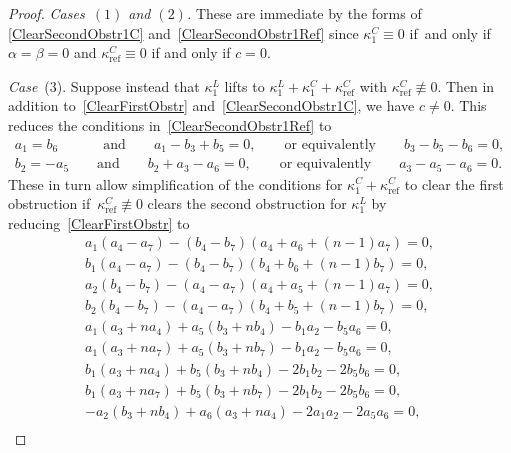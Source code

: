 \documentclass[10pt,a4paper]{amsart}
\numberwithin{equation}{section}
\DeclareMathOperator{\refl}{ref}
\begin{document}
\begin{proof}\quad

\textit{Cases~$(1)$ and $(2)$.} These are immediate by the forms of \eqref{ClearSecondObstr1C} and~\eqref{ClearSecondObstr1Ref} since $\kappa^C_1 \equiv 0$ if~and only if $\alpha=\beta=0$ and $\kappa^C_{\refl} \equiv 0$ if and only if $c=0$.

\textit{Case}~(3). Suppose instead that $\kappa^L_1$ lifts to $\kappa^L_1+\kappa^C_1+\kappa^C_{\refl}$
with $\kappa^C_{\refl} \not\equiv 0$. Then
in addition to~\eqref{ClearFirstObstr} and~\eqref{ClearSecondObstr1C},
we have $c \neq 0$. This reduces the conditions in~\eqref{ClearSecondObstr1Ref}
to
\begin{gather}\label{Obstr2kappaCrefc}
a_1=b_6 \phantom{-}\qquad \text{and} \qquad a_1-b_3+b_5=0,\qquad \text{or equivalently}\qquad b_3-b_5-b_6=0,\\
\label{Obstr2kappaCrefd}
b_2=-a_5 \qquad \text{and} \qquad b_2+a_3-a_6=0,\qquad \text{or equivalently}\qquad a_3-a_5-a_6=0.
\end{gather}
These in turn
allow simplification of the conditions for $\kappa^C_1+\kappa^C_{\refl}$ to clear the first obstruction
if~$\kappa^C_{\refl} \not\equiv 0$ clears the second obstruction for $\kappa^L_1$
by reducing~\eqref{ClearFirstObstr} to
\begin{gather}
\label{Obstr1Simplifieda}
a_1(a_4 -a_7) - (b_4-b_7)(a_4+a_6+(n-1)a_7)=0, \\
\label{Obstr1Simplifiedb}
b_1(a_4 - a_7) -(b_4 -b_7)(b_4 + b_6 + (n-1) b_7)=0, \\
\label{Obstr1Simplifiedaprime}
a_2(b_4 -b_7) -(a_4-a_7)(a_4+a_5+(n-1)a_7)=0, \\
\label{Obstr1Simplifiedbprime}
b_2(b_4 -b_7) -(a_4 - a_7)(b_4 + b_5 + (n-1) b_7)=0, \\
\label{Obstr1Simplifiedc}
a_1(a_3 + na_4) + a_5(b_3 + nb_4) -b_1 a_2 - b_5 a_6=0, \\
\label{Obstr1Simplifiedd}
a_1(a_3 + na_7) + a_5(b_3 + nb_7) -b_1 a_2 -b_5 a_6=0, \\
\label{Obstr1Simplifiede}
b_1(a_3 + na_4) + b_5(b_3 + nb_4)- 2b_1 b_2 -2b_5 b_6=0, \\
\label{Obstr1simplifiedf}
b_1(a_3 + na_7) + b_5 (b_3 + nb_7) - 2b_1 b_2 -2b_5 b_6=0, \\
\label{Obstr1Simplifiedg}
-a_2(b_3 + nb_4) + a_6(a_3 + na_4) - 2a_1 a_2 - 2a_5 a_6=0, \\

\end{gather}
\end{proof}
\end{document}
